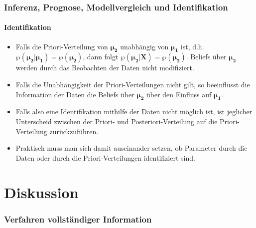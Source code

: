 \documentclass{beamer} %
\begin{document}
\begin{frame}\frametitle{Inferenz, Prognose, Modellvergleich und Identifikation}\framesubtitle{Identifikation}
\begin{itemize}
  \item Falls die Priori-Verteilung von $\boldsymbol{\mu_2}$ unabhängig von $\boldsymbol{\mu_1}$ ist, d.h. $\wp (\boldsymbol{\mu_2}|\boldsymbol{\mu_1})=\wp(\boldsymbol{\mu_2})$, dann folgt $\wp(\boldsymbol{\mu_2}|\mathbf{X})=\wp(\boldsymbol{\mu_2})$. Beliefs über $\boldsymbol{\mu_2}$ werden durch das Beobachten der Daten nicht modifiziert.
  \item Falls die Unabhängigkeit der Priori-Verteilungen nicht gilt, so beeinflusst die Information der Daten die Beliefs über $\boldsymbol{\mu_2}$ über den Einfluss auf $\boldsymbol{\mu_1}$.
  \item Falls also eine Identifikation mithilfe der Daten nicht möglich ist, ist jeglicher Unterscheid zwischen der Priori- und Posteriori-Verteilung auf die Priori-Verteilung zurückzuführen.
  \item Praktisch muss man sich damit auseinander setzen, ob Parameter durch die Daten oder durch die Priori-Verteilungen identifiziert sind.
\end{itemize}
\end{frame}


\section{Diskussion}
\begin{frame}\frametitle{Verfahren vollst\"{a}ndiger Information}
  \tableofcontents[currentsection]
\end{frame}
\end{document}
